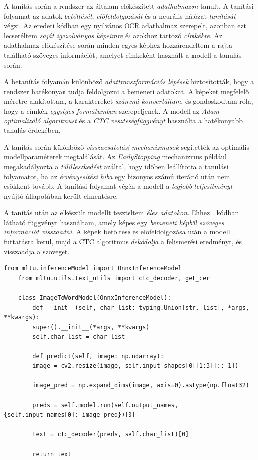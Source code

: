 \documentclass[
]{thesis-ekf}
\theoremstyle{definition}
\theoremstyle{remark}
\begin{document}
A tanítás során a rendszer az általam előkészített \emph{adathalmazon} tanult. A tanítási folyamat az adatok \emph{betöltését}, \emph{előfeldolgozását} és a neurális hálózat \emph{tanítását} végzi. Az eredeti kódban egy nyilvános OCR adathalmaz szerepelt, azonban ezt lecseréltem \emph{saját igazolványos képeimre} és azokhoz tartozó \emph{címkékre}. Az adathalmaz előkészítése során minden egyes képhez hozzárendeltem a rajta található szöveges információt, amelyet címkeként használt a modell a tanulás során.

A betanítás folyamán különböző \emph{adattranszformációs lépések} biztosították, hogy a rendszer hatékonyan tudja feldolgozni a bemeneti adatokat. A képeket megfelelő méretre alakítottam, a karaktereket \emph{számmá konvertáltam}, és gondoskodtam róla, hogy a címkék \emph{egységes formátumban} szerepeljenek. A modell az \emph{Adam optimalizáló algoritmust} és a \emph{CTC veszteségfüggvényt} használta a hatékonyabb tanulás érdekében.

A tanítás során különböző \emph{visszacsatolási mechanizmusok} segítették az optimális modellparaméterek megtalálását. Az \emph{EarlyStopping} mechanizmus például megakadályozta a \emph{túlilleszkedést} azáltal, hogy időben leállította a tanulási folyamatot, ha az \emph{érvényesítési hiba} egy bizonyos számú iteráció után nem csökkent tovább. A tanítási folyamat végén a modell a \emph{legjobb teljesítményt} nyújtó állapotában került elmentésre.

A tanítás után az elkészült modellt teszteltem \emph{éles adatokon}. Ehhez . kódban látható függvényt használtam, amely képes egy \emph{bemeneti képből szöveges információt visszaadni}. A képek betöltése és előfeldolgozása után a modell futtatásra kerül, majd a CTC algoritmus \emph{dekódolja} a felismerési eredményt, és visszaadja a szöveget.

\begin{lstlisting}[style=mypython,caption=Modell tesztelése, label=kod-python4]
	from mltu.inferenceModel import OnnxInferenceModel
	from mltu.utils.text_utils import ctc_decoder, get_cer
	
	class ImageToWordModel(OnnxInferenceModel):
		def __init__(self, char_list: typing.Union[str, list], *args, **kwargs):
		super().__init__(*args, **kwargs)
		self.char_list = char_list
	
		def predict(self, image: np.ndarray):
		image = cv2.resize(image, self.input_shapes[0][1:3][::-1])
		
		image_pred = np.expand_dims(image, axis=0).astype(np.float32)
		
		preds = self.model.run(self.output_names, {self.input_names[0]: image_pred})[0]
		
		text = ctc_decoder(preds, self.char_list)[0]
		
		return text
\end{lstlisting}
\end{document}
